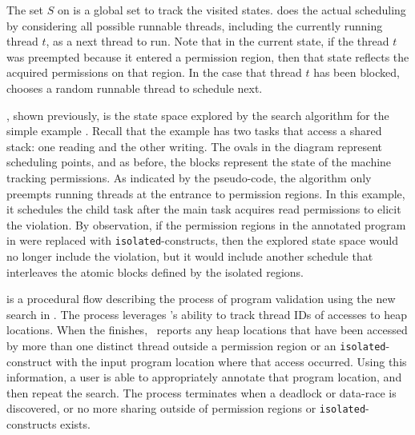 The set $S$ on  is a global set to track the
visited states.  does the actual scheduling by
considering all possible runnable threads, including the currently
running thread $t$, as a next thread to run. Note that in the current
state, if the thread $t$ was preempted because it entered a permission
region, then that state reflects the acquired permissions on that
region. In the case that thread $t$ has been blocked,
 chooses a random runnable thread to schedule next.

, shown previously, is the state space explored by
the search algorithm for the simple example
. Recall that the example has two tasks
that access a shared stack: one reading and the other writing. The
ovals in the diagram represent scheduling points, and as before, the
blocks represent the state of the machine tracking permissions. As
indicated by the pseudo-code, the algorithm only preempts running
threads at the entrance to permission regions. In this example, it
schedules the child task after the main task acquires read permissions
to elicit the violation. By observation, if the permission regions in the annotated program in
 were replaced with \texttt{isolated}-constructs, then the explored state space would no longer include the violation, but it would include another schedule that interleaves the atomic blocks defined by the isolated regions.

 is a procedural flow describing the process of
program validation using the new search in
. The process leverages \jpf's ability to track
thread IDs of accesses to heap locations. When the 
finishes, \jpf\ reports any heap locations that have been accessed by
more than one distinct thread outside a permission region or an
\texttt{isolated}-construct with the input program location where that
access occurred. Using this information, a user is able to
appropriately annotate that program location, and then repeat the
search. The process terminates when a deadlock or data-race is
discovered, or no more sharing outside of permission regions or \texttt{isolated}-constructs exists.

